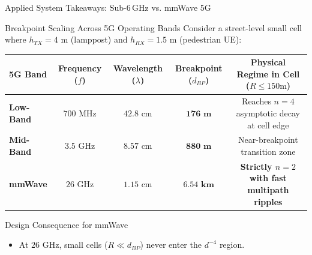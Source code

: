 \documentclass[aspectratio=169, 10pt]{beamer}
\begin{document}
\begin{frame}{Applied System Takeaways: Sub-6\,GHz vs. mmWave 5G}
    \begin{exampleblock}{Breakpoint Scaling Across 5G Operating Bands}
        Consider a street-level small cell where $h_{TX} = 4\text{ m}$ (lamppost) and $h_{RX} = 1.5\text{ m}$ (pedestrian UE):
    \end{exampleblock}

    \begin{table}[h]
        \centering
        \small
        \footnotesize
        \begin{tabular}{lcccc}
            \toprule
            \textbf{5G Band} & \textbf{Frequency ($f$)} & \textbf{Wavelength ($\lambda$)} & \textbf{Breakpoint ($d_{BP}$)} & \textbf{Physical Regime in Cell ($R \le 150\text{m}$)} \\
            \midrule
            \textbf{Low-Band} & $700\text{ MHz}$ & $42.8\text{ cm}$ & $\mathbf{176\text{ m}}$ & Reaches $n=4$ asymptotic decay at cell edge \\
            \textbf{Mid-Band} & $3.5\text{ GHz}$ & $8.57\text{ cm}$ & $\mathbf{880\text{ m}}$ & Near-breakpoint transition zone \\
            \textbf{mmWave} & $26\text{ GHz}$ & $1.15\text{ cm}$ & $\mathbf{6.54\text{ km}}$ & \textbf{Strictly $n=2$ with fast multipath ripples} \\
            \bottomrule
        \end{tabular}
    \end{table}

    \begin{alertblock}{Design Consequence for mmWave}
        \begin{itemize}
            \item At $26\text{ GHz}$, small cells ($R \ll d_{BP}$) never enter the $d^{-4}$ region.
        \end{itemize}
    \end{alertblock}
\end{frame}
\end{document}
